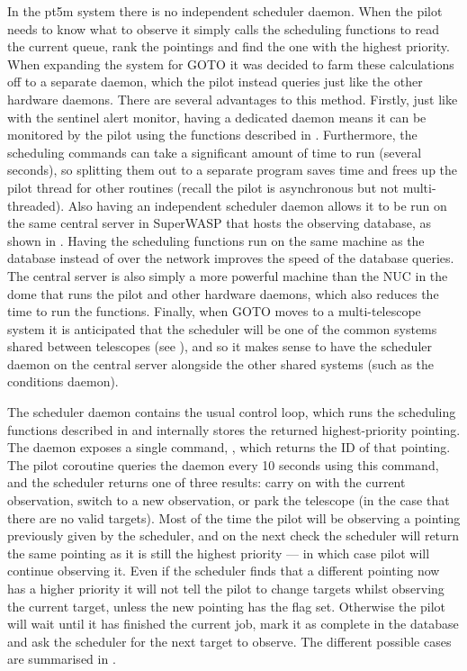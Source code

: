 \begin{colsection}
\begin{colsection}
In the \gls{pt5m} system there is no independent scheduler daemon. When the pilot needs to know what to observe it simply calls the scheduling functions to read the current queue, rank the pointings and find the one with the highest priority. When expanding the system for GOTO it was decided to farm these calculations off to a separate daemon, which the pilot instead queries just like the other hardware daemons. There are several advantages to this method. Firstly, just like with the sentinel alert monitor, having a dedicated daemon means it can be monitored by the pilot using the functions described in . Furthermore, the scheduling commands can take a significant amount of time to run (several seconds), so splitting them out to a separate program saves time and frees up the pilot thread for other routines (recall the pilot is asynchronous but not multi-threaded). Also having an independent scheduler daemon allows it to be run on the same central server in SuperWASP that hosts the observing database, as shown in . Having the scheduling functions run on the same machine as the database instead of over the network improves the speed of the database queries. The central server is also simply a more powerful machine than the NUC in the dome that runs the pilot and other hardware daemons, which also reduces the time to run the functions. Finally, when GOTO moves to a multi-telescope system it is anticipated that the scheduler will be one of the common systems shared between telescopes (see ), and so it makes sense to have the scheduler daemon on the central server alongside the other shared systems (such as the conditions daemon).

The scheduler daemon contains the usual control loop, which runs the scheduling functions described in  and internally stores the returned highest-priority pointing. The daemon exposes a single command, , which returns the ID of that pointing. The pilot  coroutine queries the daemon every 10 seconds using this command, and the scheduler returns one of three results: carry on with the current observation, switch to a new observation, or park the telescope (in the case that there are no valid targets). Most of the time the pilot will be observing a pointing previously given by the scheduler, and on the next check the scheduler will return the same pointing as it is still the highest priority --- in which case pilot will continue observing it. Even if the scheduler finds that a different pointing now has a higher priority it will not tell the pilot to change targets whilst observing the current target, unless the new pointing has the  flag set. Otherwise the pilot will wait until it has finished the current job, mark it as complete in the database and ask the scheduler for the next target to observe. The different possible cases are summarised in .


\end{colsection}
\end{colsection}
